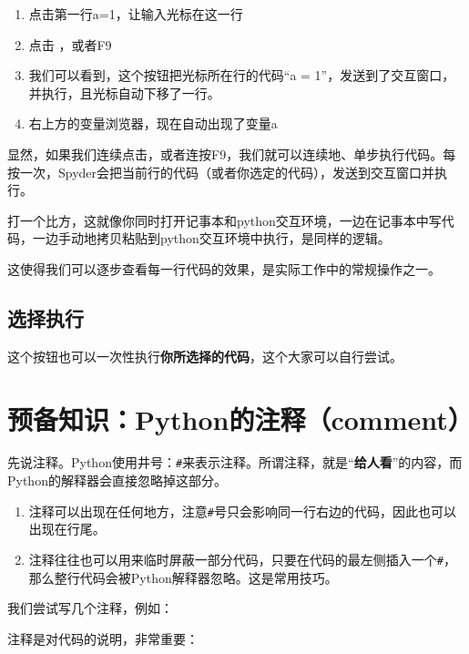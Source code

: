 \documentclass[
]{book}
\providecommand{\tightlist}{%
  \setlength{\itemsep}{0pt}\setlength{\parskip}{0pt}}
\begin{document}
\begin{enumerate}
\def\labelenumi{\arabic{enumi}.}
\tightlist
\item
  点击第一行a=1，让输入光标在这一行
\item
  点击 ，或者F9
\item
  我们可以看到，这个按钮把光标所在行的代码``a = 1''，发送到了交互窗口，并执行，且光标自动下移了一行。
\item
  右上方的变量浏览器，现在自动出现了变量a
\end{enumerate}

显然，如果我们连续点击，或者连按F9，我们就可以连续地、单步执行代码。每按一次，Spyder会把当前行的代码（或者你选定的代码），发送到交互窗口并执行。

打一个比方，这就像你同时打开记事本和python交互环境，一边在记事本中写代码，一边手动地拷贝粘贴到python交互环境中执行，是同样的逻辑。

这使得我们可以逐步查看每一行代码的效果，是实际工作中的常规操作之一。

\hypertarget{ux9009ux62e9ux6267ux884c}{%
\subsection{选择执行}\label{ux9009ux62e9ux6267ux884c}}

这个按钮也可以一次性执行\textbf{你所选择的代码}，这个大家可以自行尝试。

\hypertarget{ux9884ux5907ux77e5ux8bc6pythonux7684ux6ce8ux91cacomment}{%
\section{预备知识：Python的注释（comment）}\label{ux9884ux5907ux77e5ux8bc6pythonux7684ux6ce8ux91cacomment}}

先说注释。Python使用井号：\texttt{\#}来表示注释。所谓注释，就是``\textbf{给人看}''的内容，而Python的解释器会直接忽略掉这部分。

\begin{enumerate}
\def\labelenumi{\arabic{enumi}.}
\tightlist
\item
  注释可以出现在任何地方，注意\texttt{\#}号只会影响同一行右边的代码，因此也可以出现在行尾。
\item
  注释往往也可以用来临时屏蔽一部分代码，只要在代码的最左侧插入一个\texttt{\#}，那么整行代码会被Python解释器忽略。这是常用技巧。
\end{enumerate}

我们尝试写几个注释，例如：

注释是对代码的说明，非常重要：
\end{document}
